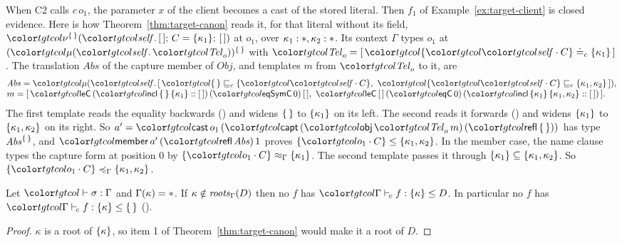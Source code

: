 \begin{example}\label{ex:target-member}
When C2 calls $c\,o_1$, the parameter $x$ of the client becomes a cast of the stored literal. Then $f_1$ of Example~\ref{ex:target-client} is closed evidence. Here is how Theorem~\ref{thm:target-canon} reads it, for that literal without its field, $\litc{\cempty}{\tnil}{C = \cset{\kappa_1}}{\tnil}$ at $o_1$, over $\kappa_1 : \ast, \kappa_2 : \ast$. Its context $\Gamma$ types $o_1$ at $\capt{(\obj{\tel_o})}{\cempty}$ with $\tel_o = [\,\peqc{\cset{\sel{\self}{C}}}{\cset{\kappa_1}}\,]$. The translation $\mathit{Abs}$ of the capture member of $\mathit{Obj}$, and templates $m$ from $\tel_o$ to it, are
\[
\begin{array}{@{}l@{}}
\mathit{Abs} = \obj{[\,\plec{\cempty}{\cset{\sel{\self}{C}}},\ \plec{\cset{\sel{\self}{C}}}{\cset{\kappa_1,\kappa_2}}\,]} , \\
m = [\,\ev{leC}\,(\ev{incl}\,\cempty\,\cset{\kappa_1} :: [\,])\,(\ev{eqSymC}\,0)\,[\,],\ \ev{leC}\,[\,]\,(\ev{eqC}\,0)\,(\ev{incl}\,\cset{\kappa_1}\,\cset{\kappa_1,\kappa_2} :: [\,])\,] .
\end{array}
\]
The first template reads the equality backwards () and widens $\{\,\}$ to $\{\kappa_1\}$ on its left. The second reads it forwards () and widens $\{\kappa_1\}$ to $\{\kappa_1,\kappa_2\}$ on its right. So $a' = \ev{cast}\,o_1\,(\ev{capt}\,(\ev{obj}\,\tel_o\,m)\,(\ev{refl}\,\cempty))$ has type $\mathit{Abs}^{\{\,\}}$, and $\ev{member}\,a'\,(\ev{refl}\,\mathit{Abs})\,1$ proves $\cset{\sel{o_1}{C}} \le \cset{\kappa_1,\kappa_2}$. In the member case, the name clause types the capture form at position 0 by $\capeqv{\Gamma}{\cset{\sel{o_1}{C}}}{\cset{\kappa_1}}$. The second template passes it through $\{\kappa_1\} \subseteq \{\kappa_1,\kappa_2\}$. So $\caple{\Gamma}{\cset{\sel{o_1}{C}}}{\cset{\kappa_1,\kappa_2}}$.
\end{example}

\begin{corollary}\label{cor:target-star}
Let $\storej{\sigma}{\Gamma}$ and $\Gamma(\kappa) = \ast$. If $\kappa \notin \mathit{roots}_{\Gamma}(D)$ then no $f$ has $\clej{\Gamma}{f}{\cset{\kappa}}{D}$. In particular no $f$ has $\clej{\Gamma}{f}{\cset{\kappa}}{\cempty}$ ().
\end{corollary}

\begin{proof}
$\kappa$ is a root of $\{\kappa\}$, so item 1 of Theorem~\ref{thm:target-canon} would make it a root of $D$.
\end{proof}


